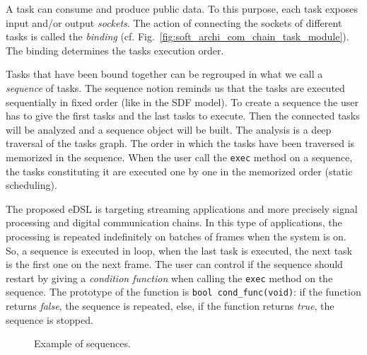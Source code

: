 A task can consume and produce public data. To this purpose, each task exposes
input and/or output \emph{sockets}. The action of connecting the sockets of
different tasks is called the \emph{binding} (cf.
Fig.~\ref{fig:soft_archi_com_chain_task_module}).
The binding determines the tasks execution order.

Tasks that have been bound together can be regrouped in what we call a
\emph{sequence} of tasks. The sequence notion reminds us that the tasks are
executed sequentially in fixed order (like in the SDF model). To create a
sequence the user has to give the first tasks and the last tasks to execute.
Then the connected tasks will be analyzed and a sequence object will be built.
The analysis is a deep traversal of the tasks graph. The order in which the
tasks have been traversed is memorized in the sequence. When the user call the
\verb|exec| method on a sequence, the tasks constituting it are executed one by
one in the memorized order (static scheduling).

The proposed eDSL is targeting streaming applications and more precisely signal
processing and digital communication chains. In this type of applications, the
processing is repeated indefinitely on batches of frames when the system is on.
So, a sequence is executed in loop, when the last task is executed, the next
task is the first one on the next frame. The user can control if the sequence
should restart by giving a \emph{condition function} when calling the
\verb|exec| method on the sequence. The prototype of the function is
\verb|bool cond_func(void)|: if the function returns \emph{false}, the sequence
is repeated, else, if the function returns \emph{true}, the sequence is stopped.

\begin{figure}[htp]
  \centering
  \quad
  \caption{Example of sequences.}
  \label{fig:dsl_sequence}
\end{figure}

